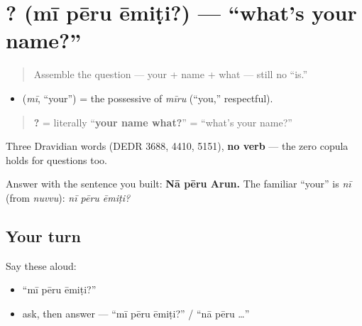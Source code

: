 \section[\texorpdfstring{\te{మీ} \te{పేరు} \te{ఏమిటి}? (mī pēru ēmiṭi?)}{మీ పేరు ఏమిటి? (mī pēru ēmiṭi?)}]{  ? (mī pēru ēmiṭi?) — \textquotedblleft{}what's your name?\textquotedblright{}}

\label{lesson:TE-C02-mii-peru-emiti}



\begin{quote}
Assemble the question — your + name + what — still no \textquotedblleft{}is.\textquotedblright{}
\end{quote}

\begin{cousinweb}
\begin{itemize}
\raggedright
  \item \textbf{} (\emph{mī}, \textquotedblleft{}your\textquotedblright{}) = the possessive of \emph{mīru} (\textquotedblleft{}you,\textquotedblright{} respectful).
\end{itemize}

\begin{quote}
\textbf{  ?} = literally \textquotedblleft{}\textbf{your name what?}\textquotedblright{} = \textquotedblleft{}what's your name?\textquotedblright{}
\end{quote}

Three Dravidian words (DEDR 3688, 4410, 5151), \textbf{no verb} — the zero copula holds for questions too.
\end{cousinweb}

\begin{grammarlens}[title={Grammar Lens: answer, and the familiar version}]
Answer with the sentence you built: \textbf{Nā pēru Arun.} The familiar \textquotedblleft{}your\textquotedblright{} is \emph{nī} (from \emph{nuvvu}): \emph{nī pēru ēmiṭi?}
\end{grammarlens}

\subsection*{Your turn}
Say these aloud:

\begin{itemize}
\raggedright
  \item \textquotedblleft{}mī pēru ēmiṭi?\textquotedblright{}
  \item ask, then answer — \textquotedblleft{}mī pēru ēmiṭi?\textquotedblright{} / \textquotedblleft{}nā pēru …\textquotedblright{}
\end{itemize}

